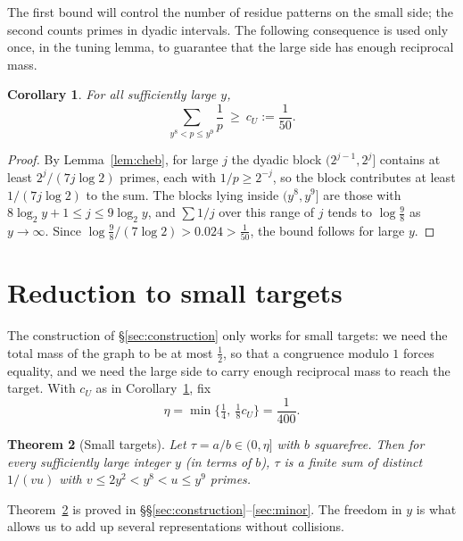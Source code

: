 \documentclass[11pt]{amsart}
\newtheorem{theorem}{Theorem}[section]
\newtheorem{corollary}[theorem]{Corollary}
\theoremstyle{definition}
\theoremstyle{remark}
\begin{document}
The first bound will control the number of residue patterns on the small side; the second counts primes in dyadic intervals. The following consequence is used only once, in the tuning lemma, to guarantee that the large side has enough reciprocal mass.

\begin{corollary}\label{cor:mertens}
For all sufficiently large $y$,
\[
 \sum_{y^8<p\le y^9}\frac1p\ \ge\ c_U:=\frac1{50} .
\]
\end{corollary}
\begin{proof}
By Lemma~\ref{lem:cheb}, for large $j$ the dyadic block $(2^{j-1},2^j]$ contains at least $2^j/(7j\log2)$ primes, each with $1/p\ge2^{-j}$, so the block contributes at least $1/(7j\log 2)$ to the sum. The blocks lying inside $(y^8,y^9]$ are those with $8\log_2y+1\le j\le9\log_2y$, and $\sum1/j$ over this range of $j$ tends to $\log\frac98$ as $y\to\infty$. Since $\log\frac98/(7\log2)>0.024>\frac1{50}$, the bound follows for large $y$.
\end{proof}

\section{Reduction to small targets}\label{sec:reduction}

The construction of \S\ref{sec:construction} only works for small targets: we need the total mass of the graph to be at most $\frac12$, so that a congruence modulo $1$ forces equality, and we need the large side to carry enough reciprocal mass to reach the target. With $c_U$ as in Corollary~\ref{cor:mertens}, fix
\[
 \eta=\min\big\{\tfrac14,\ \tfrac18c_U\big\}=\frac1{400}.
\]

\begin{theorem}[Small targets]\label{thm:small}
Let $\tau=a/b\in(0,\eta]$ with $b$ squarefree. Then for every sufficiently large integer $y$ (in terms of $b$), $\tau$ is a finite sum of distinct $1/(vu)$ with $v\le 2y^2<y^8<u\le y^9$ primes.
\end{theorem}

Theorem~\ref{thm:small} is proved in \S\S\ref{sec:construction}--\ref{sec:minor}. The freedom in $y$ is what allows us to add up several representations without collisions.
\end{document}
